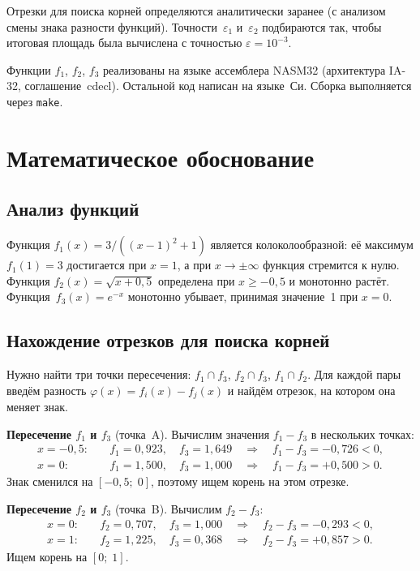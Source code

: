 \documentclass[a4paper,12pt,titlepage,finall]{article}
\begin{document}
Отрезки для поиска корней определяются аналитически заранее (с анализом смены
знака разности функций). Точности~$\varepsilon_1$ и~$\varepsilon_2$ подбираются
так, чтобы итоговая площадь была вычислена с точностью $\varepsilon = 10^{-3}$.

Функции $f_1$, $f_2$, $f_3$ реализованы на языке ассемблера NASM32 (архитектура IA-32,
соглашение~cdecl). Остальной код написан на языке~Си. Сборка выполняется через
\texttt{make}.

\newpage

\section{Математическое обоснование}

\subsection{Анализ функций}

Функция $f_1(x) = 3/((x-1)^2+1)$ является колоколообразной: её максимум $f_1(1)=3$
достигается при $x=1$, а при $x\to\pm\infty$ функция стремится к нулю. Функция
$f_2(x)=\sqrt{x+0{,}5}$ определена при $x\geq -0{,}5$ и монотонно растёт.
Функция~$f_3(x)=e^{-x}$ монотонно убывает, принимая значение~1 при $x=0$.

\subsection{Нахождение отрезков для поиска корней}

Нужно найти три точки пересечения: $f_1\cap f_3$, $f_2\cap f_3$, $f_1\cap f_2$.
Для каждой пары введём разность $\varphi(x) = f_i(x) - f_j(x)$ и найдём отрезок,
на котором она меняет знак.

\textbf{Пересечение $f_1$ и $f_3$} (точка~A). Вычислим значения $f_1 - f_3$ в нескольких
точках:
\begin{align*}
    x = -0{,}5: \quad & f_1 = 0{,}923,\quad f_3 = 1{,}649 \quad\Rightarrow\quad f_1-f_3 = -0{,}726 < 0,\\
    x = 0:      \quad & f_1 = 1{,}500,\quad f_3 = 1{,}000 \quad\Rightarrow\quad f_1-f_3 = +0{,}500 > 0.
\end{align*}
Знак сменился на $[-0{,}5;\; 0]$, поэтому ищем корень на этом отрезке.

\textbf{Пересечение $f_2$ и $f_3$} (точка~B). Вычислим $f_2 - f_3$:
\begin{align*}
    x = 0: \quad & f_2 = 0{,}707,\quad f_3 = 1{,}000 \quad\Rightarrow\quad f_2-f_3 = -0{,}293 < 0,\\
    x = 1: \quad & f_2 = 1{,}225,\quad f_3 = 0{,}368 \quad\Rightarrow\quad f_2-f_3 = +0{,}857 > 0.
\end{align*}
Ищем корень на $[0;\; 1]$.
\end{document}
